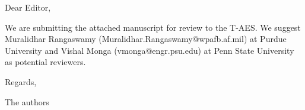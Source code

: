 \documentclass[11pt]{article}
\begin{document}
\noindent Dear Editor,

\vspace{0.1in}

\noindent We are submitting the attached manuscript for review to the T-AES. We suggest
Muralidhar Rangaswamy (Muralidhar.Rangaswamy@wpafb.af.mil) at Purdue University and Vishal
Monga (vmonga@engr.psu.edu) at Penn State University as potential reviewers.

\vspace{0.1in}

\noindent Regards,

\noindent The authors
\end{document}
